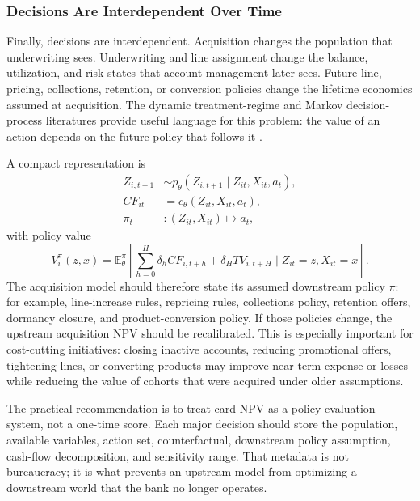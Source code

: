 \documentclass[11pt]{article}
\newcommand{\E}{\mathbb{E}}
\newcommand{\1}{\mathbf{1}}
\begin{document}
\subsubsection{Decisions Are Interdependent Over Time}
\label{subsec:interdependent-decisions}

Finally, decisions are interdependent. Acquisition changes the population that
underwriting sees. Underwriting and line assignment change the balance,
utilization, and risk states that account management later sees. Future line,
pricing, collections, retention, or conversion policies change the lifetime
economics assumed at acquisition. The dynamic treatment-regime and Markov
decision-process literatures provide useful language for this problem:
the value of an action depends on the future policy that follows it
\citep{puterman1994mdp,murphy2003dynamic,rust1987replacement}.

A compact representation is
\begin{align}
  Z_{i,t+1} &\sim p_\theta(Z_{i,t+1}\mid Z_{it},X_{it},a_t),\\
  CF_{it}  &= c_\theta(Z_{it},X_{it},a_t),\\
  \pi_t    &: (Z_{it},X_{it}) \mapsto a_t,
  \label{eq:dynamic-policy-system}
\end{align}
with policy value
\begin{equation}
  V^\pi_i(z,x)
  =
  \E_\theta^\pi
  \left[
    \sum_{h=0}^{H}\delta_h CF_{i,t+h}
    + \delta_H TV_{i,t+H}
    \mid Z_{it}=z,X_{it}=x
  \right].
  \label{eq:policy-value}
\end{equation}
The acquisition model should therefore state its assumed downstream policy
$\pi$: for example, line-increase rules, repricing rules, collections policy,
retention offers, dormancy closure, and product-conversion policy. If those
policies change, the upstream acquisition NPV should be recalibrated. This is
especially important for cost-cutting initiatives: closing inactive accounts,
reducing promotional offers, tightening lines, or converting products may
improve near-term expense or losses while reducing the value of cohorts that
were acquired under older assumptions.

The practical recommendation is to treat card NPV as a policy-evaluation
system, not a one-time score. Each major decision should store the population,
available variables, action set, counterfactual, downstream policy assumption,
cash-flow decomposition, and sensitivity range. That metadata is not bureaucracy;
it is what prevents an upstream model from optimizing a downstream world that
the bank no longer operates.
\end{document}
